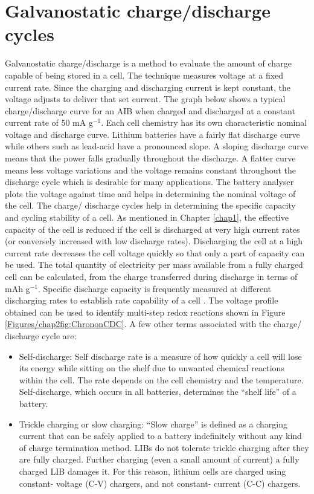 \section{Galvanostatic charge/discharge cycles}
Galvanostatic charge/discharge is a method to evaluate the amount of charge capable of being stored in a cell. The technique measures voltage at a fixed current rate. Since the charging and discharging current is kept constant, the voltage adjusts to deliver that set current. The graph below shows a typical charge/discharge curve for an AIB when charged and discharged at a constant current rate of 50 mA g$^{-1}$. Each cell chemistry has its own characteristic nominal voltage and discharge curve. Lithium batteries have a fairly flat discharge curve while others such as lead-acid have a pronounced slope. A sloping discharge curve means that the power falls gradually throughout the discharge. A flatter curve means less voltage variations and the voltage remains constant throughout the discharge cycle which is desirable for many applications. The battery analyser plots the voltage against time and helps in determining the nominal voltage of the cell. The charge/ discharge cycles help in determining the specific capacity and cycling stability of a cell. As mentioned in Chapter \ref{chap1}, the effective capacity of the cell is reduced if the cell is discharged at very high current rates (or conversely increased with low discharge rates). Discharging the cell at a high current rate decreases the cell voltage quickly so that only a part of capacity can be used. The total quantity of electricity per mass available from a fully charged cell can be calculated, from the charge transferred during discharge in terms of mAh g$^{-1}$. Specific discharge capacity is frequently measured at different discharging rates to establish rate capability of a cell \cite{pyun_electrochemistry_2012-2}. The voltage profile obtained can be used to identify multi-step redox reactions shown in Figure \ref{Figures/chap2fig:ChrononCDC}. A few other terms associated with the charge/ discharge cycle are:
\begin{itemize}
\item Self-discharge: Self discharge rate is a measure of how quickly a cell will lose its energy while sitting on the shelf due to unwanted chemical reactions within the cell. The rate depends on the cell chemistry and the temperature. Self-discharge, which occurs in all batteries, determines the \enquote{shelf life} of a battery.
\item Trickle charging or slow charging: \enquote{Slow charge} is defined as a charging current that can be safely applied to a battery indefinitely without any kind of charge termination method. LIBs do not tolerate trickle charging after they are fully charged. Further charging (even a small amount of current) a fully charged LIB damages it. For this reason, lithium cells are charged using constant- voltage (C-V) chargers, and not constant- current (C-C) chargers.

\end{itemize}

